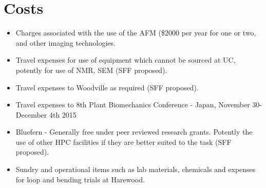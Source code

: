 \section{Costs}

\begin{itemize}
\item Charges associated with the use of the AFM (\$2000 per year for one or two, and other imaging technologies.
\end{itemize}

\begin{itemize}
\item Travel expenses for use of equipment which cannot be sourced at UC, potently for
use of NMR, SEM (SFF proposed).
\end{itemize}

\begin{itemize}
\item Travel expenses to Woodville as required (SFF proposed).
\end{itemize}
\begin{itemize}
\item Travel expenses to 8th Plant Biomechanics Conference - Japan, November
30-December 4th 2015
\end{itemize}

\begin{itemize}
\item Bluefern - Generally free under peer reviewed research grants. Potently the use
of other HPC facilities if they are better suited to the task (SFF proposed).
\end{itemize}

\begin{itemize}
\item Sundry and operational items such as lab materials, chemicals and expenses for
loop and bending trials at Harewood.
\end{itemize}
